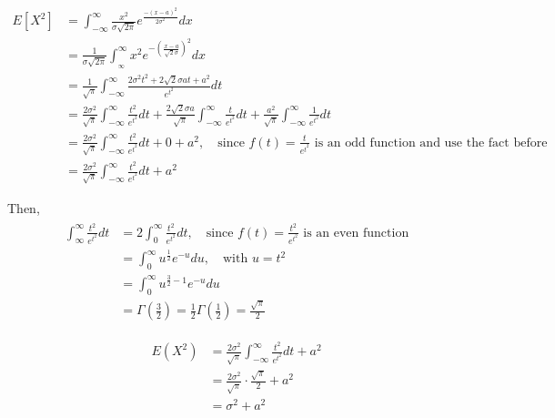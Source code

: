 \documentclass[UTF8]{article}
\begin{document}
\begin{enumerate}
            \begin{equation*}
                \begin{split}
                    E[X^2] &= \int_{-\infty}^\infty\frac{x^2}{\sigma\sqrt{2\pi}}e^{\frac{-(x-a)^2}{2\sigma^2}}dx\\
                    &=\frac{1}{\sigma\sqrt{2\pi}}\int_{_\infty}^\infty x^2e^{-(\frac{x-a}{\sqrt{2}\sigma})^2}dx \\
                    &=\frac{1}{\sqrt{\pi}}\int^\infty_{-\infty}\frac{2\sigma^2t^2+2\sqrt{2}\sigma at+a^2}{e^{t^2}}dt\\
                    &=\frac{2\sigma^2}{\sqrt{\pi}}\int^\infty_{-\infty}\frac{t^2}{e^{t^2}}dt+\frac{2\sqrt{2}\sigma a}{\sqrt{\pi}}\int^\infty_{-\infty}\frac{t}{e^{t^2}}dt+\frac{a^2}{\sqrt{\pi}}\int^\infty_{-\infty}\frac{1}{e^{t^2}}dt\\
                    &= \frac{2\sigma^2}{\sqrt{\pi}}\int^\infty_{-\infty}\frac{t^2}{e^{t^2}}dt + 0 + a^2,\quad\text{since $f(t)=\frac{t}{e^{t^2}}$ is an odd function and use the fact before}\\
                    &=\frac{2\sigma^2}{\sqrt{\pi}}\int^\infty_{-\infty}\frac{t^2}{e^{t^2}}dt + a^2
                \end{split}
            \end{equation*}
            
            Then, 
            \begin{equation*}
                \begin{split}
                    \begin{split}
                        \int^\infty_{\infty}\frac{t^2}{e^{t^2}}dt &=2\int_0^\infty\frac{t^2}{e^{t^2}}dt,\quad\text{since $f(t)=\frac{t^2}{e^{t^2}}$ is an even function}\\
                         &=\int_0^\infty u^{\frac{1}{2}}e^{-u}du,\quad\text{with $u=t^2$}\\
                         &=\int_0^\infty u^{\frac{3}{2}-1}e^{-u}du\\
                         &=\Gamma(\frac{3}{2})=\frac{1}{2}\Gamma(\frac{1}{2})=\frac{\sqrt{\pi}}{2}
                    \end{split}
                \end{split}
            \end{equation*}

            
            \begin{equation*}
                \begin{split}
                    E(X^2)&=\frac{2\sigma^2}{\sqrt{\pi}}\int^\infty_{-\infty}\frac{t^2}{e^{t^2}}dt + a^2\\
                    &=\frac{2\sigma^2}{\sqrt{\pi}}\cdot\frac{\sqrt{\pi}}{2} +a^2\\
                    &=\sigma^2+a^2
                \end{split}
            \end{equation*}


\end{enumerate}
\end{document}
